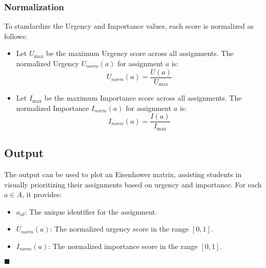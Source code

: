 \documentclass[letterpaper]{jdf}
\begin{document}
\subsubsection{Normalization}

To standardize the Urgency and Importance values, each score is normalized as follows:

\begin{itemize}
    \item Let \( U_{\max} \) be the maximum Urgency score across all assignments. The normalized Urgency \( U_{norm}(a) \) for assignment \( a \) is:
    \[
    U_{norm}(a) = \frac{U(a)}{U_{\max}}
    \]

    \item Let \( I_{\max} \) be the maximum Importance score across all assignments. The normalized Importance \( I_{norm}(a) \) for assignment \( a \) is:
    \[
    I_{norm}(a) = \frac{I(a)}{I_{\max}}
    \]
\end{itemize}

\subsection{Output}

The output can be used to plot an Eisenhower matrix, assisting students in visually prioritizing their assignments based on urgency and importance. For each \( a \in A \), it provides:

\begin{itemize}
    \item \( a_{id} \): The unique identifier for the assignment.
    \item \( U_{norm}(a) \): The normalized urgency score in the range \([0, 1]\).
    \item \( I_{norm}(a) \): The normalized importance score in the range \([0, 1]\).
\end{itemize}

\begin{center}
$\blacksquare$
\end{center}
\end{document}
